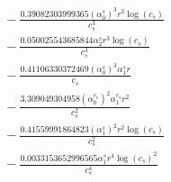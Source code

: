 \documentclass[10pt]{article}
\begin{document}
\begin{align*}
&{}  - \frac{0.39082303999365 \left(\alpha_{0}^s\right)^{3} r^{3} \log{\left(c_{s} \right)}}{c_{s}^{3}} \\
&{}  - \frac{0.050025543685844 \alpha_{2}^s r^{3} \log{\left(c_{s} \right)}}{c_{s}^{3}} \\
&{}  - \frac{0.41106330372469 \left(\alpha_{0}^s\right)^{3} \alpha_{1}^s r}{c_{s}} \\
&{}  - \frac{3.309049304958 \left(\alpha_{0}^{c_s}\right)^{2} \alpha_{1}^{c_s} r^{2}}{c_{s}^{2}} \\
&{}  - \frac{0.41559991864823 \left(\alpha_{1}^s\right)^{2} r^{2} \log{\left(c_{s} \right)}}{c_{s}^{2}} \\
&{}  - \frac{0.0033153652996565 \alpha_{1}^s r^{4} \log{\left(c_{s} \right)}^{2}}{c_{s}^{4}}
\end{align*}
\end{document}
